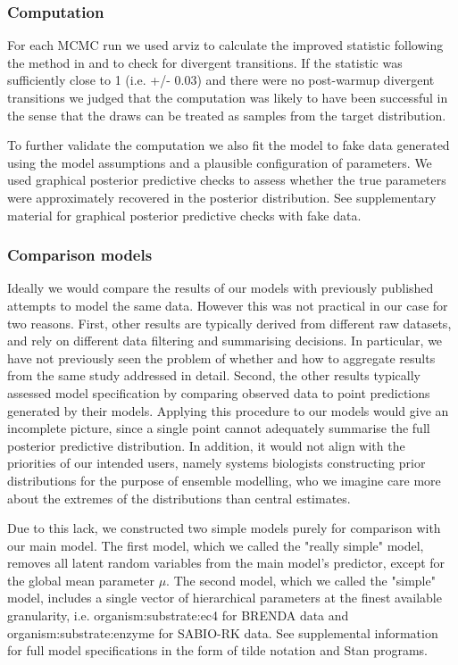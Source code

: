 \documentclass[11pt]{article}
\begin{document}
\subsubsection{Computation}
\label{sec:orge25051a}
For each MCMC run we used arviz  to
calculate the improved  statistic following the method in  and to check for
divergent transitions. If the  statistic was sufficiently close to 1
(i.e. +/- 0.03) and there were no post-warmup divergent transitions we judged
that the computation was likely to have been successful in the sense that the
draws can be treated as samples from the target distribution.

To further validate the computation we also fit the model to fake data generated
using the model assumptions and a plausible configuration of parameters. We used
graphical posterior predictive checks to assess whether the true parameters were
approximately recovered in the posterior distribution. See supplementary
material for graphical posterior predictive checks with fake data.

\subsubsection{Comparison models}
\label{sec:org091a4ae}
Ideally we would compare the results of our models with previously published
attempts to model the same data. However this was not practical in our case for
two reasons. First, other results are typically derived from different raw
datasets, and rely on different data filtering and summarising decisions. In
particular, we have not previously seen the problem of whether and how to
aggregate results from the same study addressed in detail. Second, the other
results typically assessed model specification by comparing observed data to
point predictions generated by their models. Applying this procedure to our
models would give an incomplete picture, since a single point cannot adequately
summarise the full posterior predictive distribution. In addition, it would not
align with the priorities of our intended users, namely systems biologists
constructing prior distributions for the purpose of ensemble modelling, who we
imagine care more about the extremes of the distributions than central
estimates.

Due to this lack, we constructed two simple models purely for comparison with
our main model. The first model, which we called the "really simple" model,
removes all latent random variables from the main model's predictor, except for
the global mean parameter \(\mu\). The second model, which we called the "simple"
model, includes a single vector of hierarchical parameters at the finest
available granularity, i.e. organism:substrate:ec4 for BRENDA data and
organism:substrate:enzyme for SABIO-RK data. See supplemental information for
full model specifications in the form of tilde notation and Stan programs.
\end{document}

